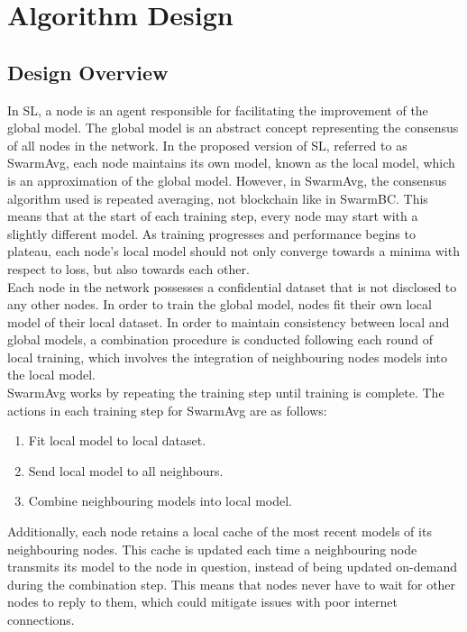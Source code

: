 \documentclass[letterpaper, 10 pt, conference]{ieeeconf}  %
\begin{document}
\section{Algorithm Design} \label{des}
\subsection{Design Overview}
In SL, a node is an agent responsible for facilitating the improvement of the global model. The global model is an abstract concept representing the consensus of all nodes in the network. In the proposed version of SL, referred to as SwarmAvg, each node maintains its own model, known as the local model, which is an approximation of the global model. However, in SwarmAvg, the consensus algorithm used is repeated averaging, not blockchain like in SwarmBC. This means that at the start of each training step, every node may start with a slightly different model. As training progresses and performance begins to plateau, each node's local model should not only converge towards a minima with respect to loss, but also towards each other. \\

Each node in the network possesses a confidential dataset that is not disclosed to any other nodes. In order to train the global model, nodes fit their own local model of their local dataset. In order to maintain consistency between local and global models, a combination procedure is conducted following each round of local training, which involves the integration of neighbouring nodes models into the local model. \\

SwarmAvg works by repeating the training step until training is complete. The actions in each training step for SwarmAvg are as follows:
\begin{enumerate}
	\item Fit local model to local dataset.
	\item Send local model to all neighbours.
	\item Combine neighbouring models into local model.
\end{enumerate}

Additionally, each node retains a local cache of the most recent models of its neighbouring nodes. This cache is updated each time a neighbouring node transmits its model to the node in question, instead of being updated on-demand during the combination step. This means that nodes never have to wait for other nodes to reply to them, which could mitigate issues with poor internet connections.
\end{document}
